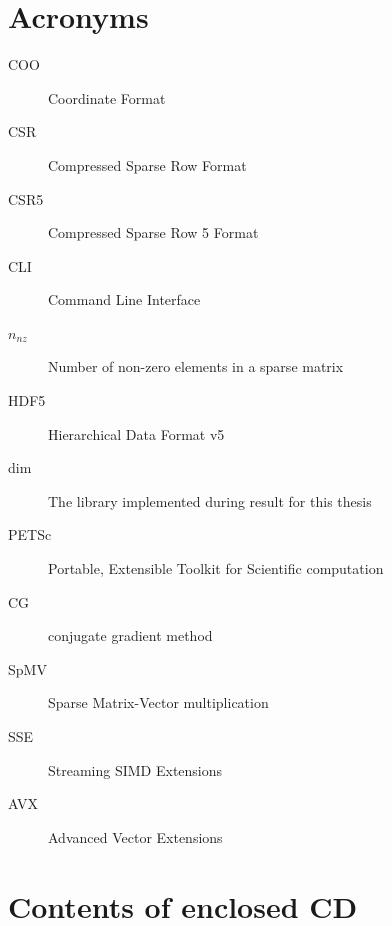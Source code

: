 \documentclass[thesis=M,english]{FITthesis}[2019/12/23]
\begin{document}
\chapter{Acronyms}
\begin{description}
    \item[COO] Coordinate Format
    \item[CSR] Compressed Sparse Row Format
    \item[CSR5] Compressed Sparse Row 5 Format
    \item[CLI] Command Line Interface
    \item[$n_{nz}$] Number of non-zero elements in a sparse matrix
    \item[HDF5] Hierarchical Data Format v5
    \item[dim]  The library implemented during result for this thesis
    \item[PETSc] Portable, Extensible Toolkit for Scientific computation
    \item[CG] conjugate gradient method
    \item[SpMV] Sparse Matrix-Vector multiplication
    \item[SSE] Streaming SIMD Extensions
    \item[AVX] Advanced Vector Extensions
\end{description}


\chapter{Contents of enclosed CD}

\end{document}
